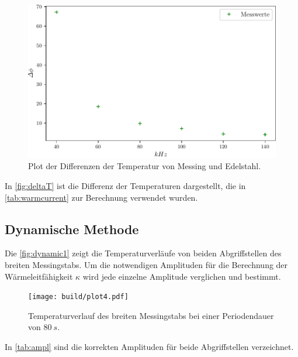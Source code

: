 \begin{figure}
    \centering
    \includegraphics[scale=0.7]{build/plot3.pdf}
    \caption{Plot der Differenzen der Temperatur von Messing und Edelstahl.}
    \label{fig:deltaT}
\end{figure}
In \autoref{fig:deltaT} ist die Differenz der Temperaturen dargestellt, die in \autoref{tab:warmcurrent} zur Berechnung verwendet wurden.

\subsection{Dynamische Methode}

Die \autoref{fig:dynamic1} zeigt die Temperaturverläufe von beiden Abgriffstellen des breiten Messingstabs.
Um die notwendigen Amplituden für die Berechnung der Wärmeleitfähigkeit $\kappa$ wird jede einzelne Amplitude verglichen und bestimmt.

\begin{figure}[htbp]
    \centering
    \texttt{[image: build/plot4.pdf]}
    \caption{Temperaturverlauf des breiten Messingstabs bei einer Periodendauer von $80\ s$.}
    \label{fig:dynamic1}
\end{figure}

In \autoref{tab:ampl} sind die korrekten Amplituden für beide Abgriffstellen verzeichnet.

